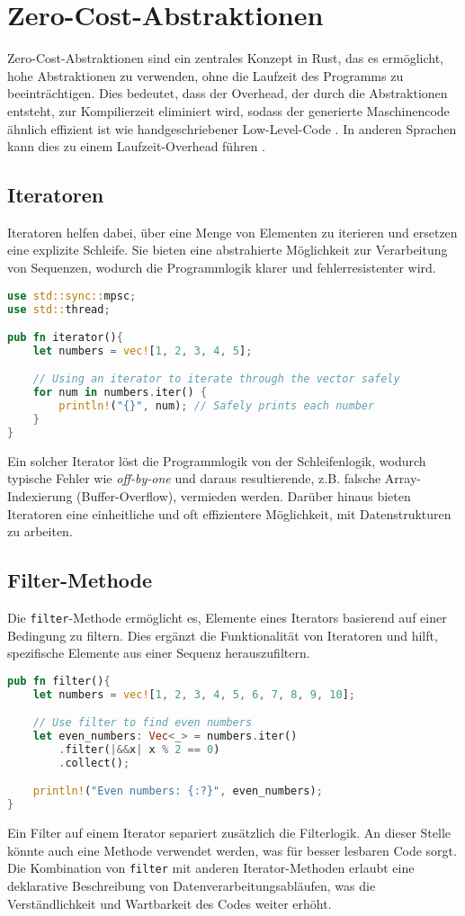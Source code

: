 \chapter{Zero-Cost-Abstraktionen}

Zero-Cost-Abstraktionen sind ein zentrales Konzept in Rust, das es ermöglicht, hohe Abstraktionen zu verwenden, ohne die Laufzeit des Programms zu beeinträchtigen. 
Dies bedeutet, dass der Overhead, der durch die Abstraktionen entsteht, zur Kompilierzeit eliminiert wird, sodass der generierte Maschinencode ähnlich effizient ist wie handgeschriebener Low-Level-Code \cite{sequeira2023}. 
In anderen Sprachen kann dies zu einem Laufzeit-Overhead führen \cite{haberman2014}.

\section{Iteratoren}
Iteratoren helfen dabei, über eine Menge von Elementen zu iterieren und ersetzen eine explizite Schleife. 
Sie bieten eine abstrahierte Möglichkeit zur Verarbeitung von Sequenzen, wodurch die Programmlogik klarer und fehlerresistenter wird.
\begin{lstlisting}[language=Rust, caption=Iterator]
use std::sync::mpsc;
use std::thread;

pub fn iterator(){
    let numbers = vec![1, 2, 3, 4, 5];

    // Using an iterator to iterate through the vector safely
    for num in numbers.iter() {
        println!("{}", num); // Safely prints each number
    }
}
\end{lstlisting}
Ein solcher Iterator löst die Programmlogik von der Schleifenlogik, wodurch typische Fehler wie \textit{\gls{off-by-one}} und daraus resultierende, z.B. falsche Array-Indexierung (Buffer-Overflow), vermieden werden. 
Darüber hinaus bieten Iteratoren eine einheitliche und oft effizientere Möglichkeit, mit Datenstrukturen zu arbeiten. 
\section{Filter-Methode}

Die \texttt{filter}-Methode ermöglicht es, Elemente eines Iterators basierend auf einer Bedingung zu filtern. 
Dies ergänzt die Funktionalität von Iteratoren und hilft, spezifische Elemente aus einer Sequenz herauszufiltern.
\begin{lstlisting}[language=Rust, caption=Filter-Funktion]
pub fn filter(){
    let numbers = vec![1, 2, 3, 4, 5, 6, 7, 8, 9, 10];

    // Use filter to find even numbers
    let even_numbers: Vec<_> = numbers.iter()
        .filter(|&&x| x % 2 == 0)
        .collect();

    println!("Even numbers: {:?}", even_numbers);
}
\end{lstlisting}
Ein Filter auf einem Iterator separiert zusätzlich die Filterlogik. 
An dieser Stelle könnte auch eine Methode verwendet werden, was für besser lesbaren Code sorgt. 
Die Kombination von \texttt{filter} mit anderen Iterator-Methoden erlaubt eine deklarative Beschreibung von Datenverarbeitungsabläufen, was die Verständlichkeit und Wartbarkeit des Codes weiter erhöht.

